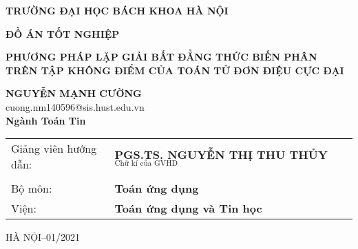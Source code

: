 \documentclass[14pt, oneside,A4paper]{book}
\theoremstyle{plain}
\renewcommand{\Large}{\fontsize{16pt}{16pt}\selectfont}
\renewcommand{\LARGE}{\fontsize{15pt}{15pt}\selectfont}
\begin{document}
\thispagestyle{empty}
\setcounter{page}{1}%

\setlength{\fboxrule}{1pt}

\begin{center}
\Large
\textbf{TRƯỜNG ĐẠI HỌC BÁCH KHOA HÀ NỘI}

\end{center}
\vspace{1cm}
\begin{center}
\fontsize{17pt}{15pt}\selectfont

\vspace{1cm}
\textbf{ĐỒ ÁN TỐT NGHIỆP}\\
\end{center}


\vspace{2cm}
\begin{center}
\fontsize{17pt}{16pt}\selectfont

\bf  PHƯƠNG PHÁP LẶP GIẢI BẤT ĐẲNG THỨC BIẾN PHÂN TRÊN TẬP KHÔNG ĐIỂM CỦA TOÁN TỬ ĐƠN ĐIỆU CỰC ĐẠI

\end{center}

\vspace{1cm}
\begin{center}
	\fontsize{14pt}{16pt}\selectfont 	
	{\bf NGUYỄN MẠNH CƯỜNG}\\	
	\fontsize{13pt}{16pt}\selectfont
	cuong.nm140596@sis.hust.edu.vn\\
	\fontsize{14pt}{16pt}\selectfont
	{\bf Ngành Toán Tin }\\
\end{center}


\vspace{2cm}
\begin{center}
\begin{tabular}{l l}
Giảng viên hướng dẫn:&{\bf  PGS.TS. NGUYỄN THỊ THU THỦY} \quad $_{\overline{\text{Chữ kí của GVHD}}}$\\
\\
Bộ môn:&{\bf Toán ứng dụng}\\[0.5cm]
Viện:&{\bf Toán ứng dụng và Tin học}
\end{tabular}

\end{center}
\vspace{1.7cm}
\begin{center}
\LARGE HÀ NỘI--01/2021
\end{center}
\end{document}

